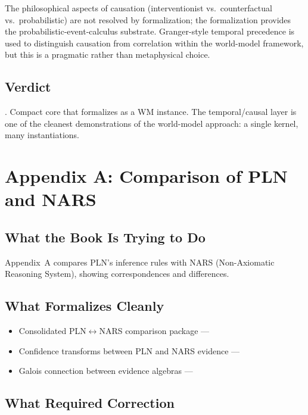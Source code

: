 \documentclass[11pt,openany]{report}
\begin{document}
The philosophical aspects of causation (interventionist vs.\
counterfactual vs.\ probabilistic) are not resolved by formalization;
the formalization provides the probabilistic-event-calculus substrate.
Granger-style temporal precedence is used to distinguish causation from
correlation within the world-model framework, but this is a pragmatic
rather than metaphysical choice.

\section{Verdict}

\verdictClean{}.  Compact core that formalizes as a WM instance.  The
temporal/causal layer is one of the cleanest demonstrations of the
world-model approach: a single kernel, many instantiations.


\chapter{Appendix A: Comparison of PLN and NARS}
\label{ch:review-appA}

\section{What the Book Is Trying to Do}

Appendix~A compares PLN's inference rules with NARS (Non-Axiomatic
Reasoning System), showing correspondences and differences.

\section{What Formalizes Cleanly}

\begin{itemize}
\item Consolidated PLN$\leftrightarrow$NARS comparison package ---
\item Confidence transforms between PLN and NARS evidence ---
\item Galois connection between evidence algebras ---
\end{itemize}

\section{What Required Correction}
\end{document}
